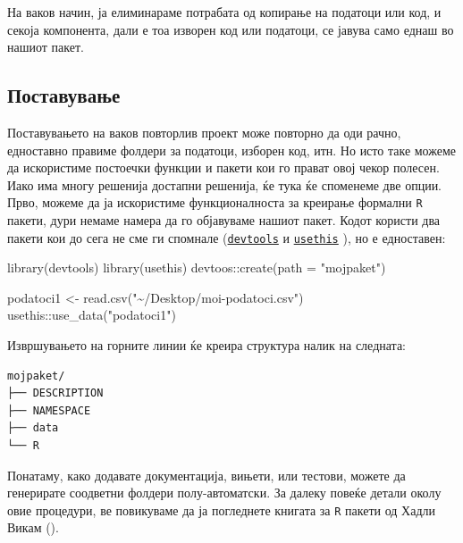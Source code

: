 \documentclass[
]{book}
\newenvironment{Shaded}{\begin{snugshade}}{\end{snugshade}}
\newcommand{\AttributeTok}[1]{\textcolor[rgb]{0.77,0.63,0.00}{#1}}
\newcommand{\FunctionTok}[1]{\textcolor[rgb]{0.00,0.00,0.00}{#1}}
\newcommand{\NormalTok}[1]{#1}
\newcommand{\OtherTok}[1]{\textcolor[rgb]{0.56,0.35,0.01}{#1}}
\newcommand{\SpecialCharTok}[1]{\textcolor[rgb]{0.00,0.00,0.00}{#1}}
\newcommand{\StringTok}[1]{\textcolor[rgb]{0.31,0.60,0.02}{#1}}
\begin{document}
На ваков начин, ја елиминараме потрабата од копирање на податоци или код, и секоја компонента, дали е тоа изворен код или податоци, се јавува само еднаш во нашиот пакет.

\hypertarget{ux43fux43eux441ux442ux430ux432ux443ux432ux430ux45aux435}{%
\subsection{Поставување}\label{ux43fux43eux441ux442ux430ux432ux443ux432ux430ux45aux435}}

Поставувањето на ваков повторлив проект може повторно да оди рачно, едноставно правиме фолдери за податоци, изборен код, итн. Но исто таке можеме да искористиме постоечки функции и пакети кои го прават овој чекор полесен. Иако има многу решенија достапни решенија, ќе тука ќе споменеме две опции. Прво, можеме да ја искористиме функционалноста за креирање формални \texttt{R} пакети, дури немаме намера да го објавуваме нашиот пакет. Кодот користи два пакети кои до сега не сме ги спомнале (\href{https://www.rdocumentation.org/packages/devtools/versions/2.3.2}{\texttt{devtools}} \citep{R-devtools} и \href{https://www.rdocumentation.org/packages/usethis/versions/2.0.0}{\texttt{usethis}} \citep{R-usethis}), но е едноставен:

\begin{Shaded}
\begin{Highlighting}[]
\FunctionTok{library}\NormalTok{(devtools)}
\FunctionTok{library}\NormalTok{(usethis)}
\NormalTok{devtoos}\SpecialCharTok{::}\FunctionTok{create}\NormalTok{(}\AttributeTok{path =} \StringTok{"mojpaket"}\NormalTok{)}

\NormalTok{podatoci1 }\OtherTok{\textless{}{-}} \FunctionTok{read.csv}\NormalTok{(}\StringTok{"\textasciitilde{}/Desktop/moi{-}podatoci.csv"}\NormalTok{)}
\NormalTok{usethis}\SpecialCharTok{::}\FunctionTok{use\_data}\NormalTok{(}\StringTok{"podatoci1"}\NormalTok{)}
\end{Highlighting}
\end{Shaded}

Извршувањето на горните линии ќе креира структура налик на следната:

\begin{verbatim}
mojpaket/
├── DESCRIPTION
├── NAMESPACE
├── data
└── R
\end{verbatim}

Понатаму, како додавате документација, вињети, или тестови, можете да генерирате соодветни фолдери полу-автоматски. За далеку повеќе детали околу овие процедури, ве повикуваме да ја погледнете книгата за \texttt{R} пакети од Хадли Викам (\citep{wickham2015r}).
\end{document}
